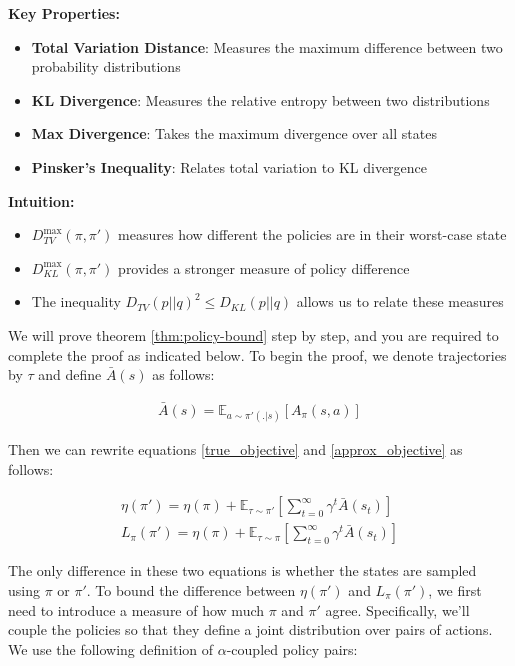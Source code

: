 \textbf{Key Properties:}
\begin{itemize}
    \item \textbf{Total Variation Distance}: Measures the maximum difference between two probability distributions
    \item \textbf{KL Divergence}: Measures the relative entropy between two distributions
    \item \textbf{Max Divergence}: Takes the maximum divergence over all states
    \item \textbf{Pinsker's Inequality}: Relates total variation to KL divergence
\end{itemize}

\textbf{Intuition:}
\begin{itemize}
    \item $D_{TV}^{\max}(\pi, \pi')$ measures how different the policies are in their worst-case state
    \item $D_{KL}^{\max}(\pi, \pi')$ provides a stronger measure of policy difference
    \item The inequality $D_{TV}(p||q)^2 \le D_{KL}(p||q)$ allows us to relate these measures
\end{itemize}

We will prove theorem \ref{thm:policy-bound} step by step, and you are required to complete the proof as indicated below. To begin the proof, we denote trajectories by $\tau$ and define $\bar{A}(s)$ as follows:

\begin{align*}
    \bar{A}(s) = \mathbb{E}_{a \sim \pi'(.|s)}[A_{\pi}(s, a)]
\end{align*}

Then we can rewrite equations \ref{true_objective} and \ref{approx_objective} as follows:

\begin{align}
    \eta(\pi') = \eta(\pi) + \mathbb{E}_{\tau \sim \pi'}[\sum_{t = 0}^{\infty}\gamma^t \bar{A}(s_t)] \\
    L_{\pi}(\pi') = \eta(\pi) + \mathbb{E}_{\tau \sim \pi}[\sum_{t = 0}^{\infty}\gamma^t \bar{A}(s_t)] 
\end{align}

The only difference in these two equations is whether the states are sampled using $\pi$ or $\pi'$. To bound the difference between $\eta(\pi')$ and $L_{\pi}(\pi')$, we first need to introduce a measure of how much $\pi$ and $\pi'$ agree. Specifically, we'll couple the policies so that they define a joint distribution over pairs of actions. We use the following definition of $\alpha$-coupled policy pairs:

